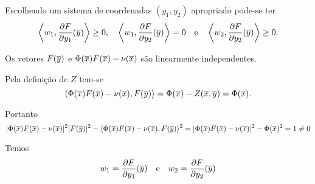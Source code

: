 Escolhendo um sistema de coordenadas $(y_1,y_2)$ apropriado pode-se ter
\begin{equation*}
\left\langle w_1, \frac{\partial F}{\partial y_1}(\overline{y}) \right\rangle \geq 0, \quad \left\langle w_1, \frac{\partial F}{\partial y_2}(\overline{y}) \right\rangle = 0 \quad \text{e} \quad \left\langle w_2, \frac{\partial F}{\partial y_2}(\overline{y}) \right\rangle \geq 0.
\end{equation*}

\begin{lema}
	Os vetores $F(\overline{y})$ e $ \Phi(\overline{x}) F(\overline{x}) - \nu(\overline{x}) $ são linearmente independentes.
\end{lema}

\begin{demonstracao}
	Pela definição de $Z$ tem-se
	\begin{equation*}
		\langle \Phi(\overline{x}) F(\overline{x}) - \nu(\overline{x}), F(\overline{y}) \rangle = \Phi(\overline{x}) - Z(\overline{x},\overline{y}) = \Phi(\overline{x}).
	\end{equation*}
	
	Portanto
	\begin{equation*}
		| \Phi(\overline{x}) F(\overline{x}) - \nu(\overline{x}) |^2 | F(\overline{y}) |^2 - \langle \Phi(\overline{x}) F(\overline{x}) - \nu(\overline{x}), F(\overline{y}) \rangle^2 = | \Phi(\overline{x}) F(\overline{x}) - \nu(\overline{x}) |^2 - \Phi(\overline{x})^2 = 1 \neq 0
	\end{equation*}
\end{demonstracao}

\begin{lema}
	Temos\begin{equation*}
		w_1 = \frac{\partial F}{\partial y_1}(\overline{y}) \quad \text{e} \quad w_2 = \frac{\partial F}{\partial y_2}(\overline{y})
	\end{equation*}
\end{lema}

